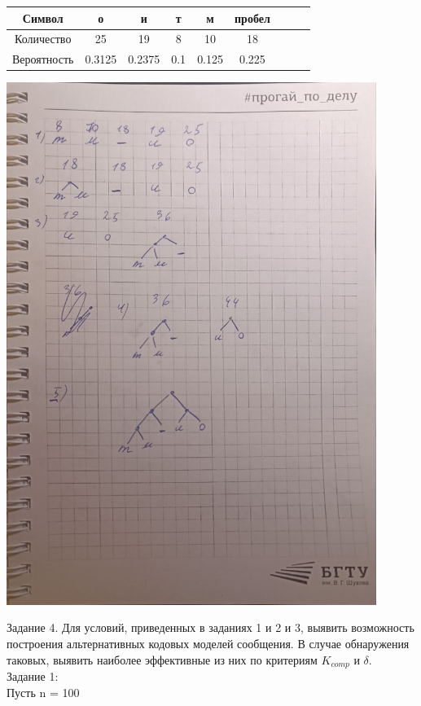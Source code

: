 \documentclass[a4paper,14pt]{extarticle}
\begin{document}
\begin{center}
    \begin{tabular}{|c|c|c|c|c|c|c|c|c|}
        \hline
        Символ      & о      & и      & т   & м     & пробел \\
        \hline
        Количество  & 25     & 19     & 8   & 10    & 18     \\
        \hline
        Вероятность & 0.3125 & 0.2375 & 0.1 & 0.125 & 0.225  \\
        \hline
    \end{tabular}
    \includegraphics[width=120mm]{task3.jpg}\\
\end{center}
Задание 4. Для условий, приведенных в заданиях 1 и 2 и 3, выявить
возможность построения альтернативных кодовых моделей сообщения. В
случае обнаружения таковых, выявить наиболее эффективные из них по
критериям $K_{comp}$ и $\delta$.\\
Задание 1:\\
Пусть n = 100\\
\end{document}
